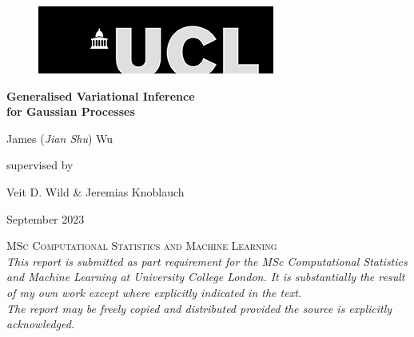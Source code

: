\documentclass{article}
\numberwithin{equation}{section}
\begin{document}
\onehalfspacing
\begin{titlepage}
	\centering
\begin{figure}[h!]
\begin{flushright}
    \includegraphics[width=.333\textwidth]{thesis_report/figures/ucl_logo.png}
\end{flushright}
\end{figure}
    {}
	\vspace{3cm}

	{\Huge\bfseries Generalised Variational Inference \\ for Gaussian Processes\par}

	\vspace{1cm}
	{\LARGE James (\textit{Jian Shu}) Wu\par}
	\vspace{0.5cm}
	supervised by\par
    \Large{Veit D. Wild \& Jeremias Knoblauch}\\
	\vfill
	{\large September 2023\par}
 \textsc{MSc Computational Statistics and Machine Learning}\\
	\vspace{1cm}
 \textit{\scriptsize{This report is submitted as part requirement for the MSc Computational Statistics and Machine Learning at University College London. It is substantially the result of my own work except where explicitly indicated in the text. \\ The report may be freely copied and distributed provided the source is explicitly acknowledged.}}


\end{titlepage}
\newpage
\setcounter{page}{1}



\end{document}
